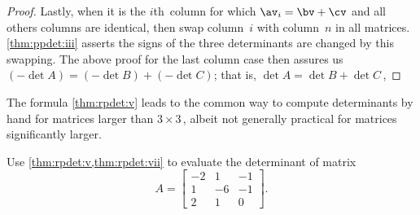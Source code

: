 \begin{proof}
Lastly, when it is the \(i\)th~column for which \(\av_i=\bv+\cv\) and all others columns are identical, then swap column~\(i\) with column~\(n\) in all matrices.  
\cref{thm:ppdet:iii} asserts the signs of the three determinants are changed by this swapping.
The above proof for the last column case then assures us \((-\det A)=(-\det B)+(-\det C)\); that is, \(\det A=\det B+\det C\)\,, 
\end{proof}


The  formula \cref{thm:rpdet:v} leads to the common way to compute determinants by hand for matrices larger than \(3\times3\)\,, albeit not generally practical for matrices significantly larger.

\begin{example} 
Use \cref{thm:rpdet:v,thm:rpdet:vii} to evaluate the determinant of matrix
\begin{equation*}
A=\begin{bmatrix}   -2&1&-1
\\   1 & -6 & -1
\\   2 &  1 & 0
\end{bmatrix}.
\end{equation*}


\end{example}
